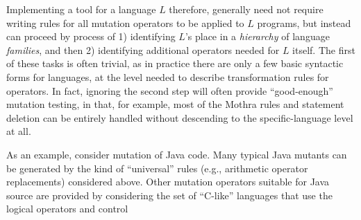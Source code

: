\documentclass[acmsmall,screen,review,anonymous]{acmart}
\begin{document}
Implementing a tool for a language $L$ therefore, generally need not
require writing rules for all mutation operators to be applied to $L$
programs, but instead can proceed by process of 1) identifying $L$'s
place in a \emph{hierarchy} of language \emph{families}, and then 2)
identifying additional operators needed for $L$ itself.  The first of
these tasks is often trivial, as in practice there are only a few
basic syntactic forms for languages, at the level needed to describe
transformation rules for operators.  In fact, ignoring the second step
will often provide ``good-enough'' mutation testing, in that, for
example, most of the Mothra rules and statement deletion can be
entirely handled without descending to the specific-language level at all.

As an
example, consider mutation of Java code.  Many typical Java mutants can be
generated by the kind of ``universal'' rules (e.g., arithmetic
operator replacements) considered above.  Other mutation operators
suitable for Java source are provided by considering the set of
``C-like'' languages that use the logical operators and control
\end{document}

